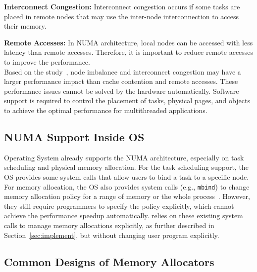 \textbf{Interconnect Congestion:} Interconnect congestion occurs if some tasks are placed in remote nodes that may use the inter-node interconnection to access their memory. 

\textbf{Remote Accesses:} In NUMA architecture, local nodes can be accessed with less latency than remote accesses. Therefore, it is important to reduce remote accesses to improve the performance.\\


 Based on the study~\citep{Blagodurov:2011:CNC:2002181.2002182}, node imbalance and interconnect congestion may have a larger performance impact than cache contention and remote accesses. These performance issues cannot be solved by the hardware automatically. Software support is required to control the placement of tasks, physical pages, and objects to achieve the optimal performance for multithreaded applications.  

\subsection{NUMA Support Inside OS} 
Operating System already supports the NUMA architecture, especially on task scheduling and physical memory allocation. For the task scheduling support, the OS provides some system calls that allow users to bind a task to a specific node. For memory allocation, the OS also provides system calls (e.g., \texttt{mbind}) to change memory allocation policy for a range of memory or the whole process~\citep{lameter2013numa, diener2015locality}. However, they still require programmers to specify the policy explicitly, which cannot achieve the performance speedup automatically. \NM{} relies on these existing system calls to manage memory allocations explicitly, as further described in Section~\ref{sec:implement}, but without changing user program explicitly.

\subsection{Common Designs of Memory Allocators}
\label{sec:commondesign}

